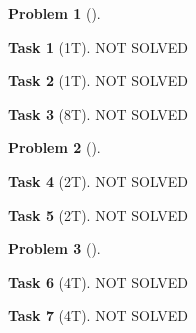 \documentclass[11pt,twoside]{article}
\theoremstyle{definition}
\newtheorem{amsproblem}{Problem}
\newtheorem{amssubproblem}{Task}[amsproblem]
\newenvironment{problem}[1][]{%
  \begin{amsproblem}[#1]
  }{%
  \end{amsproblem}
}
\newenvironment{subproblem}[1][]{%
  \begin{amssubproblem}[#1]
  }{%
  \end{amssubproblem}
}
\newcommand{\TP}[1]{#1T}
\begin{document}
\begin{problem}
  \begin{subproblem}[\TP{1}]
    NOT SOLVED %
  \end{subproblem}
  \begin{subproblem}[\TP{1}]
    NOT SOLVED %
  \end{subproblem}
  \begin{subproblem}[\TP{8}]
    NOT SOLVED %
  \end{subproblem}
\end{problem}

\noindent
\hrulefill

\begin{problem}
  \begin{subproblem}[\TP{2}]
    NOT SOLVED %
  \end{subproblem}
  \begin{subproblem}[\TP{2}]
    NOT SOLVED %
  \end{subproblem}
\end{problem}

\noindent
\hrulefill

\begin{problem}
  \begin{subproblem}[\TP{4}]
    NOT SOLVED %
  \end{subproblem}
  \begin{subproblem}[\TP{4}]
    NOT SOLVED %
  \end{subproblem}
\end{problem}

\noindent
\hrulefill
\end{document}
